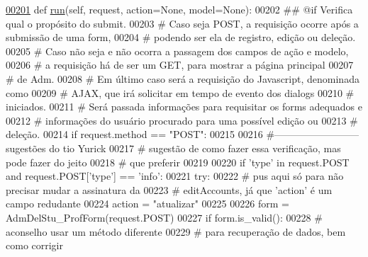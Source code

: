 \begin{DoxyCode}
\hypertarget{classAdm_1_1AdmUnit_1_1UiAdm_l00201}{}\hyperlink{classAdm_1_1AdmUnit_1_1UiAdm_a88df3b19b48d71b2c0fc0b4557c71416}{00201}     \textcolor{keyword}{def }\hyperlink{classAdm_1_1AdmUnit_1_1UiAdm_a88df3b19b48d71b2c0fc0b4557c71416}{run}(self, request, action=None, model=None):
00202         \textcolor{comment}{## @if Verifica qual o propósito do submit.
}
00203         \textcolor{comment}{#   Caso seja POST, a requisição ocorre após a submissão de uma form,
}
00204         \textcolor{comment}{#       podendo ser ela de registro, edição ou deleção.
}
00205         \textcolor{comment}{#   Caso não seja e não ocorra a passagem dos campos de ação e modelo,
}
00206         \textcolor{comment}{#       a requisição há de ser um GET, para mostrar a página principal
}
00207         \textcolor{comment}{#       de Adm.
}
00208         \textcolor{comment}{#   Em último caso será a requisição do Javascript, denominada como 
}
00209         \textcolor{comment}{#       AJAX, que irá solicitar em tempo de evento dos dialogs 
}
00210         \textcolor{comment}{#       iniciados.
}
00211         \textcolor{comment}{#   Será passada informações para requisitar os forms adequados e 
}
00212         \textcolor{comment}{#       informações do usuário procurado para uma possível edição ou 
}
00213         \textcolor{comment}{#       deleção.
}
00214         \textcolor{keywordflow}{if} request.method == \textcolor{stringliteral}{"POST"}:
00215 
00216             \textcolor{comment}{#--------------------------sugestões do tio Yurick
}
00217             \textcolor{comment}{# sugestão de como fazer essa verificação, mas pode fazer do jeito
}
00218             \textcolor{comment}{# que preferir
}
00219 
00220             \textcolor{keywordflow}{if} \textcolor{stringliteral}{'type'} \textcolor{keywordflow}{in} request.POST \textcolor{keywordflow}{and} request.POST[\textcolor{stringliteral}{'type'}] == \textcolor{stringliteral}{'info'}:
00221                 \textcolor{keywordflow}{try}:
00222                     \textcolor{comment}{# pus aqui só para não precisar mudar a assinatura da
}
00223                     \textcolor{comment}{# editAccounts, já que 'action' é um campo redudante
}
00224                     action = \textcolor{stringliteral}{"atualizar"}
00225 
00226                     form = AdmDelStu\_ProfForm(request.POST)
00227                     \textcolor{keywordflow}{if} form.is\_valid():
00228                         \textcolor{comment}{# aconselho usar um método diferente
}
00229                         \textcolor{comment}{# para recuperação de dados, bem como corrigir
}
\end{DoxyCode}
